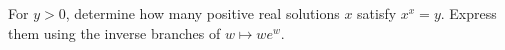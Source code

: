 For $y>0$, determine how many positive real solutions $x$ satisfy $x^x=y$. Express them using the inverse branches of $w\mapsto we^w$.
